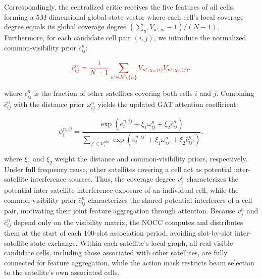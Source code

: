 \documentclass[11pt,a4paper]{article}
\newcommand{\qrev}[1]{{\color{qinrev}#1}}
\begin{document}
Correspondingly, the centralized critic receives the five features of all cells, forming a $5M$-dimensional \qrev{global state vector} where each cell's local coverage degree equals its global coverage degree $(\sum_{n'}V_{n',m}-1)/(N-1)$. Furthermore, for each candidate cell pair $(i,j)$, we introduce \qrev{the normalized common-visibility prior $\bar c_{ij}^n$}:
\par

\[
\qrev{\bar c_{ij}^n=\frac{1}{N-1}\sum_{n'\in\mathcal N\setminus\{n\}}V_{n',\chi_n(i)}V_{n',\chi_n(j)},}
\]

where $\bar c_{ij}^n$ is \qrev{the fraction of other satellites covering both cells $i$ and $j$}. Combining $\bar c_{ij}^n$ with the distance prior $\omega_{ij}^n$ yields the updated GAT attention coefficient:
\par

\[
\psi_t^{n,ij}=
\frac{\exp(e_t^{n,ij}+\xi_1\omega_{ij}^n+\xi_2\bar c_{ij}^n)}
{\sum_{j'\in\mathcal V_i^{\mathrm{nbr}}}\exp(e_t^{n,ij'}+\xi_1\omega_{ij'}^n+\xi_2\bar c_{ij'}^n)},
\]

where $\xi_1$ and $\xi_2$ weight the distance and common-visibility priors, respectively. Under full frequency reuse, other satellites covering a cell act as potential inter-satellite interference sources. Thus, the coverage degree $v_j^n$ characterizes the potential inter-satellite interference exposure of an individual cell, while the common-visibility prior $\bar c_{ij}^n$ characterizes the shared potential interferers of a cell pair, motivating their joint feature aggregation through attention. Because $v_j^n$ and $\bar c_{ij}^n$ depend only on the visibility matrix, the NOCC computes and distributes them at the start of each 100-slot association period, avoiding slot-by-slot inter-satellite state exchange. Within each satellite's local graph, all real visible candidate cells, including those associated with other satellites, are fully connected for feature aggregation, while the action mask restricts beam selection to the satellite's own associated cells.
\par
\end{document}
